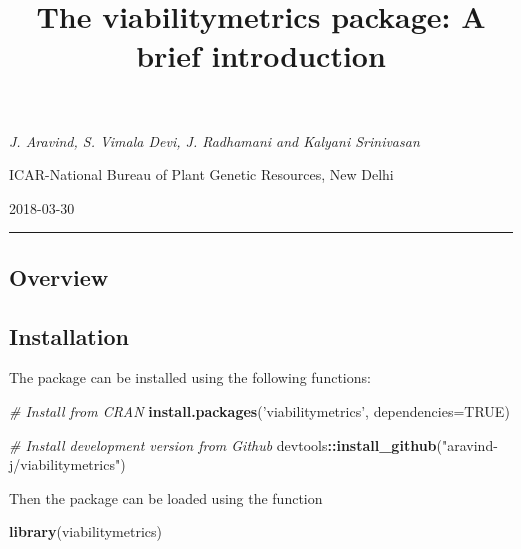 \documentclass[]{article}
\title{The \textbf{viabilitymetrics} package: A brief introduction}
\author{}
\date{}
\newenvironment{Shaded}{\begin{snugshade}}{\end{snugshade}}
\newcommand{\CommentTok}[1]{\textcolor[rgb]{0.56,0.35,0.01}{\textit{#1}}}
\newcommand{\DataTypeTok}[1]{\textcolor[rgb]{0.13,0.29,0.53}{#1}}
\newcommand{\KeywordTok}[1]{\textcolor[rgb]{0.13,0.29,0.53}{\textbf{#1}}}
\newcommand{\NormalTok}[1]{#1}
\newcommand{\OperatorTok}[1]{\textcolor[rgb]{0.81,0.36,0.00}{\textbf{#1}}}
\newcommand{\OtherTok}[1]{\textcolor[rgb]{0.56,0.35,0.01}{#1}}
\newcommand{\StringTok}[1]{\textcolor[rgb]{0.31,0.60,0.02}{#1}}
\begin{document}
\maketitle

\begin{center}
 {\it J. Aravind, S. Vimala Devi, J. Radhamani and Kalyani Srinivasan}
\end{center}

\begin{center}
 ICAR-National Bureau of Plant Genetic Resources, New Delhi
\end{center}

\begin{center}
2018-03-30
\end{center}

\begin{center}
\vspace{6pt}
\hrule
\end{center}

\tableofcontents

\hypertarget{overview}{%
\subsection{Overview}\label{overview}}

\hypertarget{installation}{%
\subsection{Installation}\label{installation}}

The package can be installed using the following functions:

\begin{Shaded}
\begin{Highlighting}[]
\CommentTok{# Install from CRAN}
\KeywordTok{install.packages}\NormalTok{(}\StringTok{'viabilitymetrics'}\NormalTok{, }\DataTypeTok{dependencies=}\OtherTok{TRUE}\NormalTok{)}

\CommentTok{# Install development version from Github}
\NormalTok{devtools}\OperatorTok{::}\KeywordTok{install_github}\NormalTok{(}\StringTok{"aravind-j/viabilitymetrics"}\NormalTok{)}
\end{Highlighting}
\end{Shaded}

Then the package can be loaded using the function

\begin{Shaded}
\begin{Highlighting}[]
\KeywordTok{library}\NormalTok{(viabilitymetrics)}
\end{Highlighting}
\end{Shaded}
\end{document}

